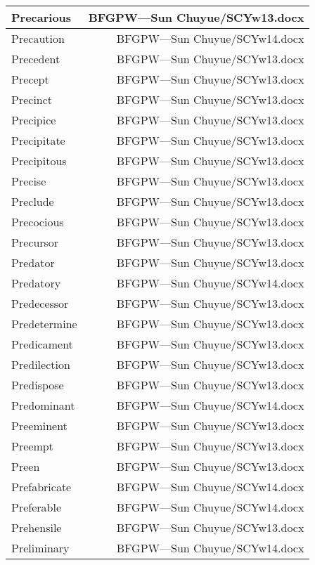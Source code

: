 \documentclass{article}
\begin{document}
\begin{center}
\begin{longtable}{|l|r|}
\hline
Precarious  &  BFGPW---Sun Chuyue/SCYw13.docx\\  
\hline
Precaution  &  BFGPW---Sun Chuyue/SCYw14.docx\\  
\hline
Precedent  &  BFGPW---Sun Chuyue/SCYw13.docx\\  
\hline
Precept  &  BFGPW---Sun Chuyue/SCYw13.docx\\  
\hline
Precinct  &  BFGPW---Sun Chuyue/SCYw13.docx\\  
\hline
Precipice  &  BFGPW---Sun Chuyue/SCYw13.docx\\  
\hline
Precipitate  &  BFGPW---Sun Chuyue/SCYw13.docx\\  
\hline
Precipitous  &  BFGPW---Sun Chuyue/SCYw13.docx\\  
\hline
Precise  &  BFGPW---Sun Chuyue/SCYw13.docx\\  
\hline
Preclude  &  BFGPW---Sun Chuyue/SCYw13.docx\\  
\hline
Precocious  &  BFGPW---Sun Chuyue/SCYw13.docx\\  
\hline
Precursor  &  BFGPW---Sun Chuyue/SCYw13.docx\\  
\hline
Predator  &  BFGPW---Sun Chuyue/SCYw13.docx\\  
\hline
Predatory  &  BFGPW---Sun Chuyue/SCYw14.docx\\  
\hline
Predecessor  &  BFGPW---Sun Chuyue/SCYw13.docx\\  
\hline
Predetermine  &  BFGPW---Sun Chuyue/SCYw13.docx\\  
\hline
Predicament  &  BFGPW---Sun Chuyue/SCYw13.docx\\  
\hline
Predilection  &  BFGPW---Sun Chuyue/SCYw13.docx\\  
\hline
Predispose  &  BFGPW---Sun Chuyue/SCYw13.docx\\  
\hline
Predominant  &  BFGPW---Sun Chuyue/SCYw14.docx\\  
\hline
Preeminent  &  BFGPW---Sun Chuyue/SCYw13.docx\\  
\hline
Preempt  &  BFGPW---Sun Chuyue/SCYw13.docx\\  
\hline
Preen  &  BFGPW---Sun Chuyue/SCYw13.docx\\  
\hline
Prefabricate  &  BFGPW---Sun Chuyue/SCYw14.docx\\  
\hline
Preferable  &  BFGPW---Sun Chuyue/SCYw14.docx\\  
\hline
Prehensile  &  BFGPW---Sun Chuyue/SCYw13.docx\\  
\hline
Preliminary  &  BFGPW---Sun Chuyue/SCYw14.docx\\  

\end{longtable}
\end{center}
\end{document}
